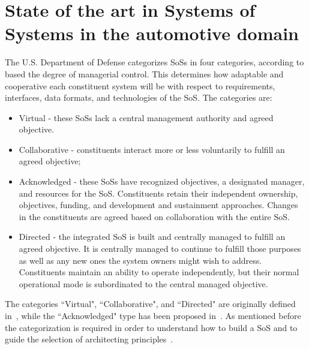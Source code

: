 \section{State of the art in Systems of Systems in the automotive domain}\label{sec:sota}




The U.S. Department of Defense categorizes SoSs  in four categories, according to based the degree of managerial control. This determines how adaptable and cooperative each constituent system will be with respect to requirements, interfaces, data formats, and technologies of the SoS. The categories are:

\begin{itemize}
\item Virtual - these SoSs lack a central management authority and agreed objective.  
\item Collaborative - constituents interact more or less voluntarily to fulfill an agreed objective;  
\item Acknowledged - these SoSs have recognized objectives, a designated manager, and resources for the SoS. Constituents retain their independent ownership, objectives, funding, and development and sustainment approaches. Changes in the constituents are agreed based on collaboration with the entire SoS. 
\item Directed - the integrated SoS is built and centrally managed to fulfill an agreed objective.  It is centrally managed to continue to fulfill those purposes as well as any new ones the system owners might wish to address. Constituents maintain an ability to operate independently, but their normal operational mode is subordinated to the central managed objective.
\end{itemize}

The categories ``Virtual", ``Collaborative", and ``Directed" are originally defined in~\cite{MeaningOfOf}, while the ``Acknowledged" type has been proposed in~\cite{maier1996sos}. As mentioned before the categorization is required in order to understand how to build a SoS and to guide the selection of architecting principles~\cite{Dahmann08}.

